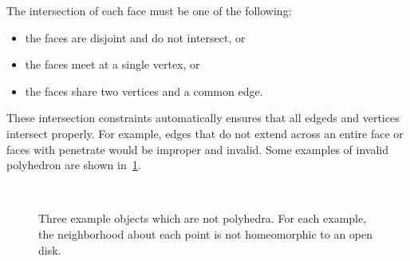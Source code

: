 The intersection of each face must be one of the following:
\begin{itemize}
    \item the faces are disjoint and do not intersect, or
    \item the faces meet at a single vertex, or
    \item the faces share two vertices and a common edge.
\end{itemize}
These intersection constraints automatically ensures that all edgeds and vertices intersect properly.
For example, edges that do not extend across an entire face or faces with penetrate would be improper and invalid.
Some examples of invalid polyhedron are shown in~\cref{fig:improper_polyhedrons}.
\begin{figure}[h]
    \centering
    ~
    ~
    \caption{Three example objects which are not polyhedra. For each example, the neighborhood about each point is not homeomorphic to an open disk.~\label{fig:improper_polyhedrons}}
\end{figure}

